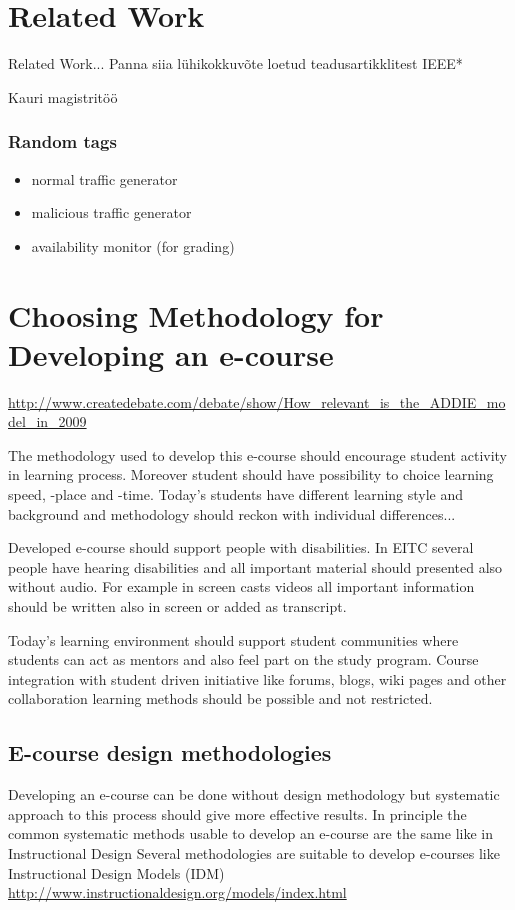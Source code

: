 \section{Related Work}
\label{Related Work}
Related Work...
Panna siia lühikokkuvõte loetud teadusartikklitest IEEE*

Kauri magistritöö




\subsubsection{Random tags}
\begin{itemize}
	\item normal traffic generator
	\item malicious traffic generator
	\item availability monitor (for grading)
\end{itemize}


\section{Choosing Methodology for Developing an e-course}

\url{http://www.createdebate.com/debate/show/How_relevant_is_the_ADDIE_model_in_2009}

The methodology used to develop this e-course should encourage student activity in learning process. Moreover student should have possibility to choice learning speed, -place and -time. Today's students have different learning style and background and methodology should reckon with individual differences...

Developed e-course should support people with disabilities. In \gls{EITC} several people have hearing disabilities and all important material should presented also without audio. For example in screen casts videos all important information should be written also in screen or added as transcript.

Today’s learning environment should support student communities where students can act as mentors and also feel part on the study program. Course integration with student driven initiative like forums, blogs, wiki pages and other collaboration learning methods should be possible and not restricted.

\subsection{E-course design methodologies}
Developing an e-course can be done without design methodology but systematic approach to this process should give more effective results. In principle the common systematic methods usable to develop an e-course are the same like in Instructional Design 
Several methodologies are suitable to develop e-courses like Instructional Design Models (IDM)
\url{http://www.instructionaldesign.org/models/index.html}

